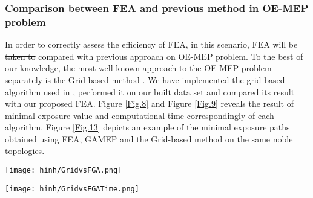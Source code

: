 \documentclass[final]{elsarticle}
\begin{document}
\subsubsection{Comparison between FEA and previous method in OE-MEP problem}
In order to correctly assess the efficiency of FEA, in this scenario, FEA will be \sout{taken to} compared with previous approach on OE-MEP problem. To the best of our knowledge, the most well-known approach to the OE-MEP problem separately is the Grid-based method \cite{liu2017obstacle}. We have implemented the grid-based algorithm used in \cite{liu2017obstacle}, performed it on our built data set and compared its result with our proposed FEA. Figure \ref{Fig.8} and Figure \ref{Fig.9} reveals the result of minimal exposure value and computational time correspondingly of each algorithm. Figure \ref{Fig.13} depicts an example of the minimal exposure paths obtained using FEA, GAMEP \cite{binh2019efficient} and the Grid-based method on the same noble topologies. 
\begin{figure*}[h]
	\texttt{[image: hinh/GridvsFGA.png]}
	\centering
	\caption{The minimal exposure value comparison between FEA and Grid based method on some noble topologies
	}
	\label{Fig.8}       %
\end{figure*}
\begin{figure*}[h]
	\texttt{[image: hinh/GridvsFGATime.png]}
	\centering
	\caption{The computational time (sec) comparison between FEA and Grid based method on some noble topologies
	}
	\label{Fig.9}       %
\end{figure*}
\end{document}
